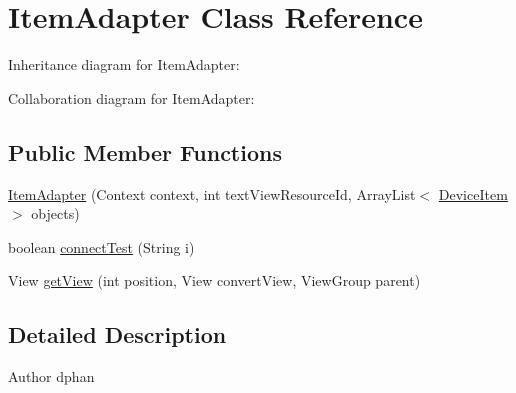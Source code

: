\hypertarget{classcom_1_1axcoto_1_1shinjuku_1_1maki_1_1_item_adapter}{\section{\-Item\-Adapter \-Class \-Reference}
\label{classcom_1_1axcoto_1_1shinjuku_1_1maki_1_1_item_adapter}
}


\-Inheritance diagram for \-Item\-Adapter\-:


\-Collaboration diagram for \-Item\-Adapter\-:
\subsection*{\-Public \-Member \-Functions}
\begin{DoxyCompactItemize}
\item 
\hyperlink{classcom_1_1axcoto_1_1shinjuku_1_1maki_1_1_item_adapter_abad456331d60ff41abe398624130462f}{\-Item\-Adapter} (\-Context context, int text\-View\-Resource\-Id, \-Array\-List$<$ \hyperlink{classcom_1_1axcoto_1_1shinjuku_1_1maki_1_1_device_item}{\-Device\-Item} $>$ objects)
\item 
boolean \hyperlink{classcom_1_1axcoto_1_1shinjuku_1_1maki_1_1_item_adapter_a43b6588c6c308b0ab351b9fadf63cc03}{connect\-Test} (\-String i)
\item 
\-View \hyperlink{classcom_1_1axcoto_1_1shinjuku_1_1maki_1_1_item_adapter_af6292d542d7937de5b4044234a2db905}{get\-View} (int position, \-View convert\-View, \-View\-Group parent)
\end{DoxyCompactItemize}


\subsection{\-Detailed \-Description}
\begin{DoxyAuthor}{\-Author}
dphan 
\end{DoxyAuthor}


